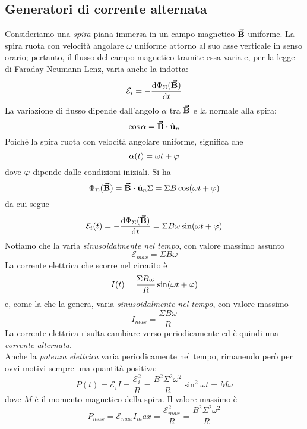 \subsection{Generatori di corrente alternata}
Consideriamo una \textit{spira} piana immersa in un campo magnetico $\vb*{\va{B}}$ uniforme. La spira ruota con velocità angolare $\omega$ uniforme attorno al suo asse verticale in senso orario; pertanto, il flusso del campo magnetico tramite essa varia e, per la legge di Faraday-Neumann-Lenz, varia anche la \fem indotta:
\begin{equation*}
	\mathcal{E}_i=-\dv{\Phi_{\Sigma}(\vb*{\va{B}})}{t}
\end{equation*}
La variazione di flusso dipende dall'angolo $\alpha$ tra $\vb*{\va{B}}$ e la normale alla spira:
\begin{equation*}
	\cos\alpha=\vba{B}\vdot\vbh{u}_n
\end{equation*}
Poiché la spira ruota con velocità angolare uniforme, significa che
\begin{equation*}
	\alpha(t)=\omega t+\oldphi
\end{equation*}
dove $\oldphi$ dipende dalle condizioni iniziali. Si ha
\begin{equation*}
	\Phi_{\Sigma}(\vba{B})=\vba{B}\vdot\vbh{u}_n\Sigma=\Sigma B\cos(\omega t+\oldphi)
\end{equation*}
da cui segue
\begin{equation}
	\mathcal{E}_i(t)=-\dv{\Phi_{\Sigma}(\vba{B})}{t}=\Sigma B\omega\sin(\omega t+\oldphi)
\end{equation}
Notiamo che la \fem varia \textit{sinusoidalmente nel tempo}, con valore massimo assunto 
\begin{equation}
	\mathcal{E}_{max}=\Sigma B\omega
\end{equation}
La corrente elettrica che scorre nel circuito è
\begin{equation}
	I(t)=\frac{\Sigma B\omega}{R}\sin(\omega t+\oldphi)
\end{equation}
e, come la \fem che la genera, varia \textit{sinusoidalmente nel tempo}, con valore massimo 
\begin{equation}
	I_{max}=\frac{\Sigma B\omega}{R}
\end{equation}
La corrente elettrica risulta cambiare verso periodicamente ed è quindi una \textit{corrente alternata}.\\ 
Anche la \textit{potenza elettrica} varia periodicamente nel tempo, rimanendo però per ovvi motivi sempre una quantità positiva:
\begin{equation}
	P(t)=\mathcal{E}_i I=\frac{\mathcal{E}_i^2}{R}=\frac{B^2\Sigma^2\omega^2}{R}\sin^2\omega t=M\omega
\end{equation}
dove $M$ è il momento magnetico della spira. Il valore massimo è
\begin{equation}
	P_{max}=\mathcal{E}_{max}I_max=\frac{\mathcal{E}_{max}^2}{R}=\frac{B^2\Sigma^2\omega^2}{R}
\end{equation}
